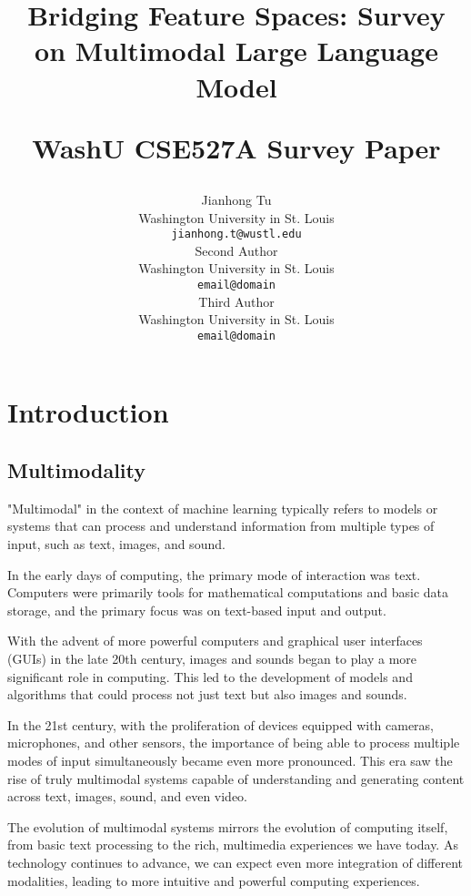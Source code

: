 \documentclass[11pt]{article}
\title{Bridging Feature Spaces: Survey on Multimodal Large Language Model



 \vspace{1em}
  \small{\normalfont WashU CSE527A Survey Paper} }
\author{Jianhong Tu \\
  Washington University in St. Louis \\
  \texttt{jianhong.t@wustl.edu} \\\And
  Second Author \\
  Washington University in St. Louis \\
  \texttt{email@domain} \\\AND
  Third Author \\
  Washington University in St. Louis \\
  \texttt{email@domain} \\}
\begin{document}
\maketitle

\begin{abstract}

\end{abstract}

\section{Introduction}

\subsection{Multimodality}
"Multimodal" in the context of machine learning typically refers to models or systems that can process and understand information from multiple types of input, such as text, images, and sound.\cite{zhihu2023}


In the early days of computing, the primary mode of interaction was text. Computers were primarily tools for mathematical computations and basic data storage, and the primary focus was on text-based input and output.


With the advent of more powerful computers and graphical user interfaces (GUIs) in the late 20th century, images and sounds began to play a more significant role in computing. This led to the development of models and algorithms that could process not just text but also images and sounds.



In the 21st century, with the proliferation of devices equipped with cameras, microphones, and other sensors, the importance of being able to process multiple modes of input simultaneously became even more pronounced. This era saw the rise of truly multimodal systems capable of understanding and generating content across text, images, sound, and even video.



The evolution of multimodal systems mirrors the evolution of computing itself, from basic text processing to the rich, multimedia experiences we have today. As technology continues to advance, we can expect even more integration of different modalities, leading to more intuitive and powerful computing experiences.\cite{csdn2023}
\end{document}
